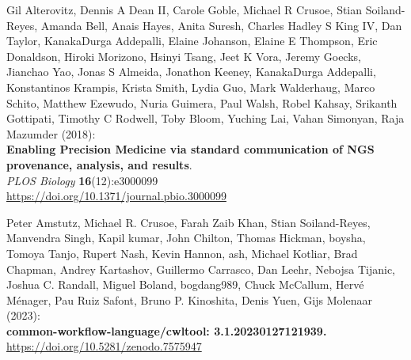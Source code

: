 \documentclass[10pt,letterpaper]{article}
\begin{document}
%
%
% 
\begin{thebibliography}{10}

\setlength{\parskip}{6pt}
\setlength{\itemsep}{0pt plus 0.3ex}


\begin{small}






Gil Alterovitz, Dennis A Dean II, Carole Goble, Michael R Crusoe, Stian Soiland-Reyes, Amanda Bell, Anais Hayes, Anita Suresh, Charles Hadley S King IV, Dan Taylor, KanakaDurga Addepalli, Elaine Johanson, Elaine E Thompson, Eric Donaldson, Hiroki Morizono, Hsinyi Tsang, Jeet K Vora, Jeremy Goecks, Jianchao Yao, Jonas S Almeida, Jonathon Keeney, KanakaDurga Addepalli, Konstantinos Krampis, Krista Smith, Lydia Guo, Mark Walderhaug, Marco Schito, Matthew Ezewudo, Nuria Guimera, Paul Walsh, Robel Kahsay, Srikanth Gottipati, Timothy C Rodwell, Toby Bloom, Yuching Lai, Vahan Simonyan, Raja Mazumder (2018):\\
\textbf{Enabling Precision Medicine via standard communication of NGS provenance, analysis, and results}.\\
\emph{PLOS Biology} \textbf{16}(12):e3000099 \\
\url{https://doi.org/10.1371/journal.pbio.3000099}

Peter Amstutz, Michael R. Crusoe, Farah Zaib Khan, Stian Soiland-Reyes, Manvendra Singh, Kapil kumar, John Chilton, Thomas Hickman, boysha, Tomoya Tanjo, Rupert Nash, Kevin Hannon, ash, Michael Kotliar, Brad Chapman, Andrey Kartashov, Guillermo Carrasco, Dan Leehr, Nebojsa Tijanic, Joshua C. Randall, Miguel Boland, bogdang989, Chuck McCallum, Hervé Ménager, Pau Ruiz Safont, Bruno P. Kinoshita, Denis Yuen, Gijs Molenaar (2023):\\
\textbf{common-workflow-language/cwltool: 3.1.20230127121939.}\\
\url{https://doi.org/10.5281/zenodo.7575947}


\end{small}
\end{thebibliography}
\end{document}
